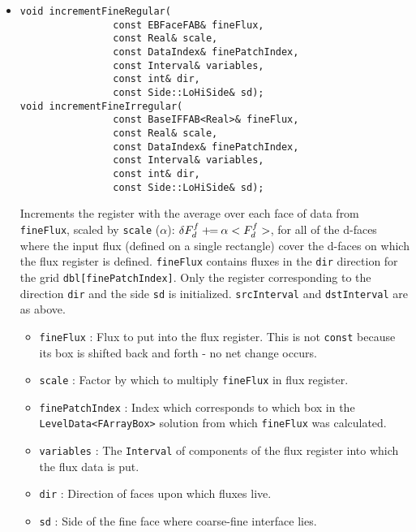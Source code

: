 \begin{itemize}
\item
\begin{small}\begin{verbatim}
void incrementFineRegular(
                const EBFaceFAB& fineFlux,
                const Real& scale,
                const DataIndex& finePatchIndex,
                const Interval& variables,
                const int& dir,
                const Side::LoHiSide& sd);
void incrementFineIrregular(
                const BaseIFFAB<Real>& fineFlux,
                const Real& scale,
                const DataIndex& finePatchIndex,
                const Interval& variables,
                const int& dir,
                const Side::LoHiSide& sd);
\end{verbatim}\end{small}
Increments the register with the average over each face of data from 
\verb/fineFlux/, scaled by \verb/scale/ ($\alpha$):
$\delta F^f_d \mathbin{+\mkern-7mu=} \alpha <F^f_d>$, for all of the d-faces
where the input flux (defined on a single rectangle) cover the
d-faces on which the flux register is defined.
\verb/fineFlux/ contains fluxes in the \verb/dir/
direction for the grid \verb/dbl[finePatchIndex]/. Only the register
corresponding to the direction \verb/dir/ and the side \verb/sd/ is 
initialized. \verb/srcInterval/ and \verb/dstInterval/ are as
above.
  \begin{itemize}
  \item
  \verb/fineFlux/ :
  Flux to put into the flux register.
  This is not \verb/const/ because its box is shifted back and forth -
  no net change occurs.
  \item
  \verb/scale/ :
  Factor by which to multiply \verb/fineFlux/ in flux register.
  \item
  \verb/finePatchIndex/ :
  Index which corresponds to which box in the \verb/LevelData<FArrayBox>/
  solution from which \verb/fineFlux/ was calculated.
  \item
  \verb/variables/ :
  The \verb/Interval/ of components of the flux register into which the
  flux data is put.
  \item
  \verb/dir/ :
  Direction of faces upon which fluxes live.
  \item
  \verb/sd/ :
  Side of the fine face where coarse-fine interface lies.
  \end{itemize}


\end{itemize}
